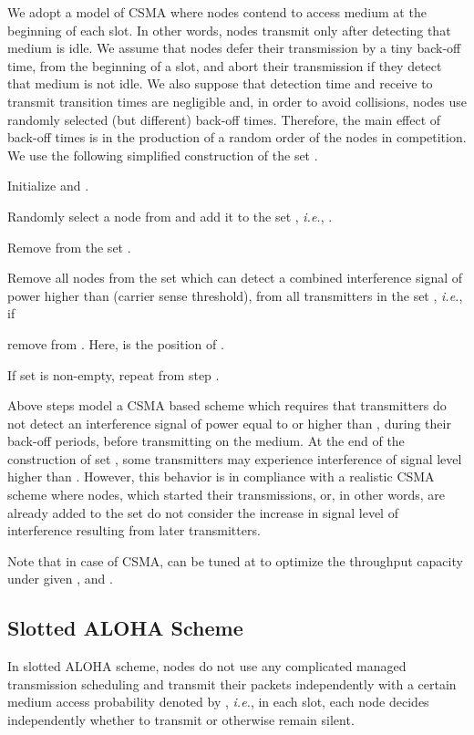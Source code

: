 \documentclass[12pt,english]{article}
\begin{document}
We adopt a model of CSMA where nodes contend to access medium at the beginning of each slot. In other words, nodes transmit only after detecting that medium is idle. We assume that nodes defer their transmission by a tiny back-off time, from the beginning of a slot, and abort their transmission if they detect that medium is not idle. We also suppose that detection time and receive to transmit transition times are negligible and, in order to avoid collisions, nodes use randomly selected (but different) back-off times. Therefore, the main effect of back-off times is in the production of a random order of the nodes in competition. We use the following simplified construction of the set . 
\begin{compactenum}
\item Initialize  and .
\item Randomly select a node  from  and add it to the set , {\it i.e.}, . 
\item Remove  from the set .
\item Remove all nodes from the set  which can detect a combined interference signal of power higher than  (carrier sense threshold), from all transmitters in the set , {\it i.e.}, if 
 
remove  from . Here,  is the position of .
\item If set  is non-empty, repeat from step .
\end{compactenum}
Above steps model a CSMA based scheme which requires that transmitters do not detect an interference signal of power equal to or higher than , during their back-off periods, before transmitting on the medium. At the end of the construction of set , some transmitters may experience interference of signal level higher than . However, this behavior is in compliance with a realistic CSMA scheme where nodes, which started their transmissions, or, in other words, are already added to the set  do not consider the increase in signal level of interference resulting from later transmitters. 

Note that in case of CSMA,  can be tuned at  to optimize the throughput capacity under given ,  and .

\subsection{Slotted ALOHA Scheme}

In slotted ALOHA scheme, nodes do not use any complicated managed transmission scheduling and transmit their packets independently with a certain medium access probability denoted by , {\it i.e.}, in each slot, each node decides independently whether to transmit or otherwise remain silent. 
\end{document}
